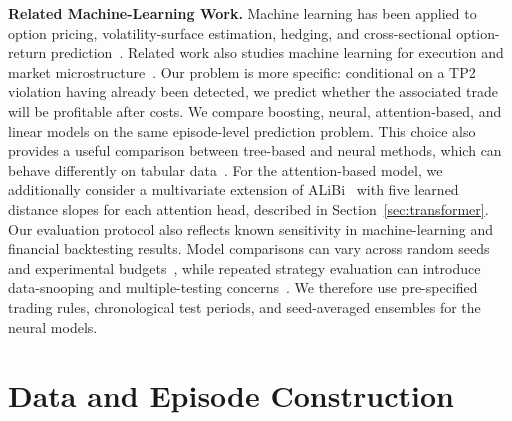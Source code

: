 \documentclass[sigconf,review,anonymous]{acmart}
\begin{document}
\smallskip\noindent\textbf{Related Machine-Learning Work.}
Machine learning has been applied to option pricing, volatility-surface estimation, hedging, and cross-sectional option-return prediction~\cite{bali2023option}. Related work also studies machine learning for execution and market microstructure~\cite{kearns2013mlmicrostructure}. Our problem is more specific: conditional on a TP2 violation having already been detected, we predict whether the associated trade will be profitable after costs.
We compare boosting, neural, attention-based, and linear models on the same episode-level prediction problem. This choice also provides a useful comparison between tree-based and neural methods, which can behave differently on tabular data~\cite{grinsztajn2022why,gorishniy2021revisiting}. For the attention-based model, we additionally consider a multivariate extension of ALiBi~\cite{press2022alibi,shaw2018self} with five learned distance slopes for each attention head, described in Section~\ref{sec:transformer}.
Our evaluation protocol also reflects known sensitivity in machine-learning and financial backtesting results. Model comparisons can vary across random seeds and experimental budgets~\cite{melis2018state,lucic2018gans,agarwal2021deep,bouthillier2021accounting,dodge2019show}, while repeated strategy evaluation can introduce data-snooping and multiple-testing concerns~\cite{white2000reality,harvey2016crosssection,bailey2014deflated}. We therefore use pre-specified trading rules, chronological test periods, and seed-averaged ensembles for the neural models.

\section{Data and Episode Construction}
\label{sec:data}
\end{document}
